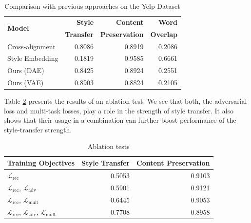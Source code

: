 \begin{table}[ht]
	\centering
	\begin{tabular}{| l | r | r | r |}
		\hline
		\multirow{2}{*}{
		\textbf{Model}}                       & \textbf{Style}    & \textbf{Content}      & \textbf{Word}    \\
		                                      & \textbf{Transfer} & \textbf{Preservation} & \textbf{Overlap} \\
		\hline
		\hline
		Cross-alignment \citep{shen2017style} & 0.8086            & 0.8919                & 0.2086           \\
		\hline
		Style Embedding \citep{fu2017style}   & 0.1819            & 0.9585                & 0.6661           \\
		\hline
		Ours (DAE)                            & 0.8425            & 0.8924                & 0.2551           \\
		\hline
		Ours (VAE)                            & 0.8903            & 0.8824                & 0.2105           \\
		\hline
	\end{tabular}
	\caption{Comparison with previous approaches on the Yelp Dataset}
	\label{tab:comparison-previous}
\end{table}


Table \ref{tab:ablation-results} presents the results of an ablation test. We see that both, the adversarial loss and multi-task losses, play a role in the strength of style transfer. It also shows that their usage in a combination can further boost performance of the style-transfer strength.


\begin{table}[ht]
	\centering
	\begin{tabular}{| l | r | r |}
		\hline
		\textbf{Training Objectives}                                                  & \textbf{Style Transfer} & \textbf{Content Preservation} \\
		\hline
		\hline
		$\mathcal{L}_\text{rec}$                                                      & 0.5053                  & 0.9103                        \\
		\hline
		$\mathcal{L}_\text{rec}$, $\mathcal{L}_\text{adv}$                            & 0.5901                  & 0.9121                        \\
		\hline
		$\mathcal{L}_\text{rec}$, $\mathcal{L}_\text{mult}$                           & 0.6445                  & 0.9053                        \\
		\hline
		$\mathcal{L}_\text{rec}$, $\mathcal{L}_\text{adv}$, $\mathcal{L}_\text{mult}$ & 0.7708                  & 0.8958                        \\
		\hline
	\end{tabular}
	\caption{Ablation tests}
	\label{tab:ablation-results}
\end{table}

